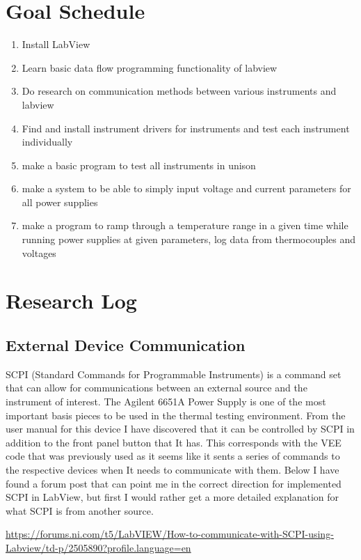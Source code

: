 \documentclass{article}
\begin{document}
\section*{Goal Schedule}
\begin{enumerate}
    \item Install LabView
    \item Learn basic data flow programming functionality of labview
    \item Do research on communication methods between various instruments and labview
    \item Find and install instrument drivers for instruments and test each instrument individually
    \item make a basic program to test all instruments in unison
    \item make a system to be able to simply input voltage and current parameters for all power supplies 
    \item make a program to ramp through a temperature range in a given time while running power supplies at given parameters, log data from thermocouples and voltages
\end{enumerate}
\newpage
\section*{Research Log}
\subsection*{External Device Communication}
SCPI (Standard Commands for Programmable Instruments) is a command set that can allow for communications between an external source and the instrument of interest. The Agilent 6651A Power Supply is one of the most important basis pieces to be used in the thermal testing environment. From the user manual for this device I have discovered that it can be controlled by SCPI in addition to the front panel button that It has. This corresponds with the VEE code that was previously used as it seems like it sents a series of commands to the respective devices when It needs to communicate with them. Below I have found a forum post that can point me in the correct direction for implemented SCPI in LabView, but first I would rather get a more detailed explanation for what SCPI is from another source.

\begin{center}
    \url{https://forums.ni.com/t5/LabVIEW/How-to-communicate-with-SCPI-using-Labview/td-p/2505890?profile.language=en}
\end{center}
\end{document}
